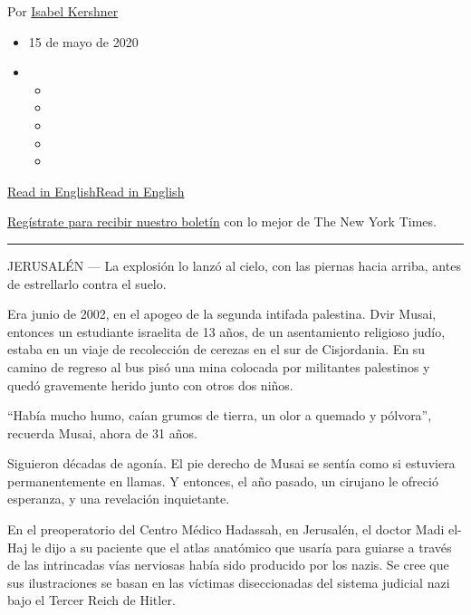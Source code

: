 Por \href{https://www.nytimes.com/by/isabel-kershner}{Isabel Kershner}

\begin{itemize}
\item
  15 de mayo de 2020
\item
  \begin{itemize}
  \item
  \item
  \item
  \item
  \item
  \end{itemize}
\end{itemize}

\href{https://www.nytimes.com/2020/05/12/world/middleeast/nazi-medical-text-israel.html}{Read
in
English}\href{https://www.nytimes.com/2020/05/12/world/middleeast/nazi-medical-text-israel.html}{Read
in English}

\href{https://www.nytimes.com/newsletters/el-times}{Regístrate para
recibir nuestro boletín} con lo mejor de The New York Times.

\begin{center}\rule{0.5\linewidth}{\linethickness}\end{center}

JERUSALÉN --- La explosión lo lanzó al cielo, con las piernas hacia
arriba, antes de estrellarlo contra el suelo.

Era junio de 2002, en el apogeo de la segunda intifada palestina. Dvir
Musai, entonces un estudiante israelita de 13 años, de un asentamiento
religioso judío, estaba en un viaje de recolección de cerezas en el sur
de Cisjordania. En su camino de regreso al bus pisó una mina colocada
por militantes palestinos y quedó gravemente herido junto con otros dos
niños.

``Había mucho humo, caían grumos de tierra, un olor a quemado y
pólvora'', recuerda Musai, ahora de 31 años.

Siguieron décadas de agonía. El pie derecho de Musai se sentía como si
estuviera permanentemente en llamas. Y entonces, el año pasado, un
cirujano le ofreció esperanza, y una revelación inquietante.

En el preoperatorio del Centro Médico Hadassah, en Jerusalén, el doctor
Madi el-Haj le dijo a su paciente que el atlas anatómico que usaría para
guiarse a través de las intrincadas vías nerviosas había sido producido
por los nazis. Se cree que sus ilustraciones se basan en las víctimas
diseccionadas del sistema judicial nazi bajo el Tercer Reich de Hitler.

